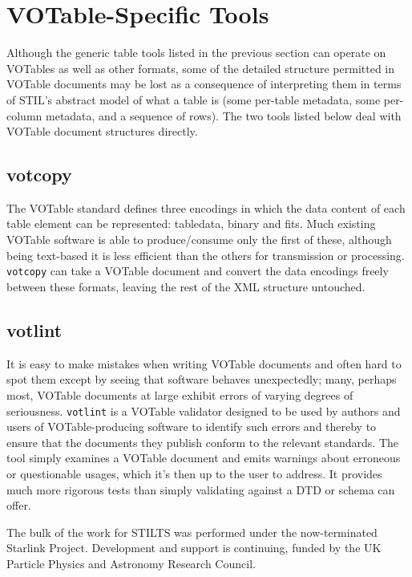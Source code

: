 \documentclass[11pt,twoside]{article}  %
\begin{document}
\section{VOTable-Specific Tools}

Although the generic table tools listed in the previous section
can operate on VOTables as well as other formats, 
some of the detailed structure permitted in VOTable documents 
may be lost as a consequence of interpreting them in terms of
STIL's abstract model of what a table is (some per-table metadata,
some per-column metadata, and a sequence of rows).
The two tools listed below deal with VOTable document structures
directly.

\subsection{votcopy}

The VOTable standard defines three encodings in which the
data content of each table element can be represented:
{\sc tabledata}, {\sc binary} and {\sc fits}.
Much existing VOTable software is able to produce/consume only the
first of these, although being text-based it is less efficient 
than the others
for transmission or processing.
{\tt votcopy} can take a VOTable document and convert the data
encodings freely between these formats, leaving the rest of
the XML structure untouched.

\subsection{votlint}

It is easy to make mistakes when writing VOTable documents
and often hard to spot them except by seeing that software 
behaves unexpectedly;
many, perhaps most, VOTable documents at large
exhibit errors of varying degrees of seriousness.
{\tt votlint} is a VOTable validator designed to be used
by authors and users of VOTable-producing software to 
identify such errors and thereby to ensure that the documents they
publish conform to the relevant standards.
The tool simply examines a VOTable document and emits 
warnings about erroneous or questionable usages,
which it's then up to the user to address.
It provides much more rigorous tests than simply validating
against a DTD or schema can offer.

\acknowledgements

The bulk of the work for STILTS was performed under the now-terminated
Starlink Project.  Development and support is continuing,
funded by the UK Particle Physics and Astronomy Research Council.
\end{document}
